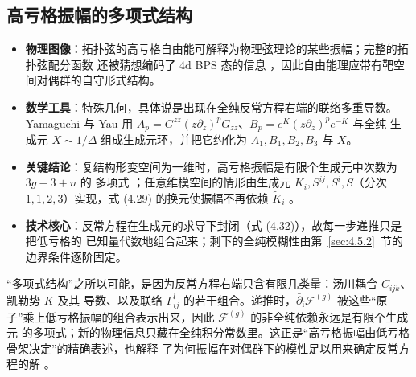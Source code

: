 

\subsection{高亏格振幅的多项式结构}
\label{sec:4.4}

\begin{keytakeaways}
  \begin{itemize}[leftmargin=1.4em,itemsep=2pt,topsep=2pt]
    \item \textbf{物理图像}：拓扑弦的高亏格自由能可解释为物理弦理论的某些振幅；完整的拓扑弦配分函数
          还被猜想编码了 4d BPS 态的信息 \cite{ref73}，因此自由能理应带有靶空间对偶群的自守形式结构。
    \item \textbf{数学工具}：特殊几何，具体说是出现在全纯反常方程右端的联络多重导数。Yamaguchi 与
          Yau 用 $A_p=G^{z\bar z}(z\partial_z)^pG_{z\bar z}$、$B_p=e^{K}(z\partial_z)^pe^{-K}$ 与全纯
          生成元 $X\sim1/\Delta$ 组成生成元环，并把它约化为 $A_1,B_1,B_2,B_3$ 与 $X$。
    \item \textbf{关键结论}：复结构形变空间为一维时，高亏格振幅是有限个生成元中次数为 $3g-3+n$ 的
          多项式 \cite{ref21}；任意维模空间的情形由生成元 $K_i,S^{ij},S^i,S$（分次 $1,1,2,3$）实现，式 (4.29)
          的换元使振幅不再依赖 $\tilde K_i$ \cite{ref22}。
    \item \textbf{技术核心}：反常方程在生成元的求导下封闭（式 (4.32)），故每一步递推只是把低亏格的
          已知量代数地组合起来；剩下的全纯模糊性由第~\ref{sec:4.5.2}~节的边界条件逐阶固定。
  \end{itemize}
\end{keytakeaways}

\begin{yizhu}[物理图像]
“多项式结构”之所以可能，是因为反常方程右端只含有限几类量：汤川耦合 $C_{ijk}$、凯勒势 $K$ 及其
导数、以及联络 $\Gamma^l_{ij}$ 的若干组合。递推时，$\bar\partial_{\bar\imath}\mathcal{F}^{(g)}$
被这些“原子”乘上低亏格振幅的组合表示出来，因此 $\mathcal{F}^{(g)}$ 的非全纯依赖永远是有限个生成元
的多项式；新的物理信息只藏在全纯积分常数里。这正是“高亏格振幅由低亏格骨架决定”的精确表述，也解释
了为何振幅在对偶群下的模性足以用来确定反常方程的解 \cite{ref19}。
\end{yizhu}

